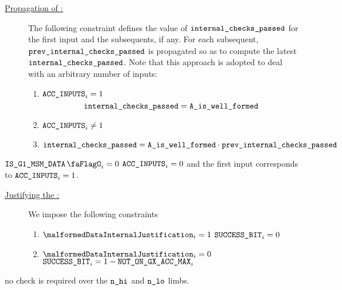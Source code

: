 \begin{description}
    \item[\underline{Propagation of \locInternalChecksPassed:}]
          The following constraint defines the value of $\texttt{internal\_checks\_passed}$ for the first input and the subsequents, if any.
          For each subsequent, $\texttt{prev\_}\texttt{internal\_checks\_passed}$ is propagated so as to compute the latest $\texttt{internal\_checks\_passed}$.
          Note that this approach is adopted to deal with an arbitrary number of inputs:
          \begin{enumerate}
              \item \If $\texttt{ACC\_INPUTS}_{i} = 1$ \Then
                    \[
                        \texttt{internal\_checks\_passed} = \texttt{A\_is\_well\_formed} 
                    \]
              \item \If $\texttt{ACC\_INPUTS}_{i} \neq 1$ \Then
                    \item $\texttt{internal\_checks\_passed} = \texttt{A\_is\_well\_formed} \cdot \texttt{prev\_}\texttt{internal\_checks\_passed}$
          \end{enumerate}
\end{description}
\saNote{} \If $\isBlsGOneMsmData_{i} = 0$ \Then $\texttt{ACC\_INPUTS}_{i} = 0$ and the first input corresponds to $\texttt{ACC\_INPUTS}_{i} = 1$.
\begin{description}
    \item[\underline{Justifying the \blsSuccessBit{}:}]
          We impose the following constraints
          \begin{enumerate}
              \item \If $\malformedDataInternalJustification _{i} = 1$ \Then $\texttt{SUCCESS\_BIT} _{i} = 0$
              \item \If $\malformedDataInternalJustification _{i} = 0$ \Then $\texttt{SUCCESS\_BIT}_{i} = 1 - \texttt{NOT\_ON\_GX\_ACC\_MAX} _{i}$
          \end{enumerate}
\end{description}

\saNote{} no check is required over the $\texttt{n}\texttt{\_hi}$ and $\texttt{n}\texttt{\_lo}$ limbs.
